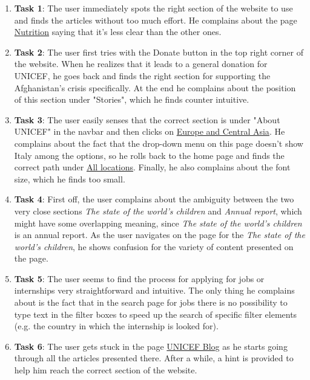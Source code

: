 \begin{enumerate}
	\item \textbf{Task 1}: The user immediately spots the right section of the website to use and finds the articles without too much effort. He complains about the page \href{https://www.unicef.org/nutrition}{Nutrition} saying that it's less clear than the other ones.
	\item \textbf{Task 2}: The user first tries with the Donate button in the top right corner of the website. When he realizes that it leads to a general donation for UNICEF, he goes back and finds the right section for supporting the Afghanistan's crisis specifically. At the end he complains about the position of this section under "Stories", which he finds counter intuitive.
	\item \textbf{Task 3}: The user easily senses that the correct section is under "About UNICEF" in the navbar and then clicks on \href{https://www.unicef.org/where-we-work#europe-and-central-asia}{Europe and Central Asia}. He complains about the fact that the drop-down menu on this page doesn't show Italy among the options, so he rolls back to the home page and finds the correct path under \href{https://www.unicef.org/where-we-work}{All locations}. Finally, he also complains about the font size, which he finds too small.
	\item \textbf{Task 4}: First off, the user complains about the ambiguity between the two very close sections \textit{The state of the world's children} and \textit{Annual report}, which might have some overlapping meaning, since \textit{The state of the world's children} is an annual report. As the user navigates on the page for the \textit{The state of the world's children}, he shows confusion for the variety of content presented on the page.
	\item \textbf{Task 5}: The user seems to find the process for applying for jobs or internships very straightforward and intuitive. The only thing he complains about is the fact that in the search page for jobs there is no possibility to type text in the filter boxes to speed up the search of specific filter elements (e.g. the country in which the internship is looked for).
	\item \textbf{Task 6}: The user gets stuck in the page \href{https://www.unicef.org/blog}{UNICEF Blog} as he starts going through all the articles presented there. After a while, a hint is provided to help him reach the correct section of the website.
	
\end{enumerate}





